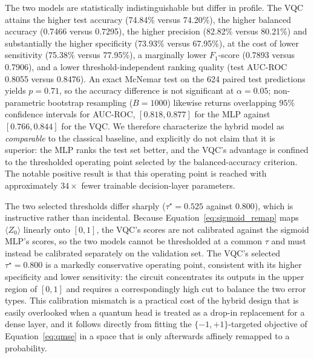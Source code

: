 \documentclass[11pt,a4paper]{article}
\begin{document}
The two models are statistically indistinguishable but differ in profile.  The
VQC attains the higher test accuracy (74.84\% versus 74.20\%), the higher
balanced accuracy (0.7466 versus 0.7295), the higher precision (82.82\% versus
80.21\%) and substantially the higher specificity (73.93\% versus 67.95\%), at
the cost of lower sensitivity (75.38\% versus 77.95\%), a marginally lower
$F_1$-score (0.7893 versus 0.7906), and a lower threshold-independent ranking
quality (test AUC-ROC 0.8055 versus 0.8476).  An exact McNemar test on the 624
paired test predictions yields $p = 0.71$, so the accuracy difference is not
significant at $\alpha = 0.05$; non-parametric bootstrap resampling
($B = 1000$) likewise returns overlapping $95\%$ confidence intervals for
AUC-ROC, $[0.818, 0.877]$ for the MLP against $[0.766, 0.844]$ for the VQC.
We therefore characterize the hybrid model as \emph{comparable} to the
classical baseline, and explicitly do not claim that it is superior: the MLP
ranks the test set better, and the VQC's advantage is confined to the
thresholded operating point selected by the balanced-accuracy criterion.  The
notable positive result is that this operating point is reached with
approximately $34\times$ fewer trainable decision-layer parameters.

The two selected thresholds differ sharply ($\tau^\star = 0.525$ against
$0.800$), which is instructive rather than incidental.  Because
Equation~\ref{eq:sigmoid_remap} maps $\langle Z_0\rangle$ linearly onto
$[0,1]$, the VQC's scores are not calibrated against the sigmoid MLP's scores,
so the two models cannot be thresholded at a common $\tau$ and must instead be
calibrated separately on the validation set.  The VQC's selected
$\tau^\star = 0.800$ is a markedly conservative operating point, consistent
with its higher specificity and lower sensitivity: the circuit concentrates
its outputs in the upper region of $[0,1]$ and requires a correspondingly high
cut to balance the two error types.  This calibration mismatch is a practical
cost of the hybrid design that is easily overlooked when a quantum head is
treated as a drop-in replacement for a dense layer, and it follows directly
from fitting the $\{-1,+1\}$-targeted objective of Equation~\ref{eq:qmse} in a
space that is only afterwards affinely remapped to a probability.
\end{document}
